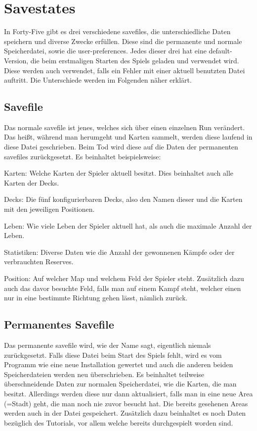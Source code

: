 
\renewcommand{\kapitelautor}{Autor: Felix Zwickelstorfer}
\section{Savestates}\label{sec:savestates}
\renewcommand{\kapitelautor}{Autor: Felix Zwickelstorfer}

In Forty-Five gibt es drei verschiedene savefiles, die unterschiedliche Daten speichern und diverse Zwecke erfüllen.
Diese sind die permanente und normale Speicherdatei, sowie die user-preferences.
Jedes dieser drei hat eine default-Version, die beim erstmaligen Starten des Spiels geladen und verwendet wird.
Diese werden auch verwendet, falls ein Fehler mit einer aktuell benutzten Datei auftritt.
Die Unterschiede werden im Folgenden näher erklärt.

\subsection{Savefile}\label{subsec:savefile}

Das normale savefile ist jenes, welches sich über einen einzelnen Run verändert.
Das heißt, während man herumgeht und Karten sammelt, werden diese laufend in diese Datei geschrieben.
Beim Tod wird diese auf die Daten der permanenten savefiles zurückgesetzt.
Es beinhaltet beispielsweise:
\begin{liste}
    \item Karten: Welche Karten der Spieler aktuell besitzt.
    Dies beinhaltet auch alle Karten der Decks.
    \item Decks: Die fünf konfigurierbaren Decks, also den Namen dieser und die Karten mit den jeweiligen Positionen.
    \item Leben: Wie viele Leben der Spieler aktuell hat, als auch die maximale Anzahl der Leben.
    \item Statistiken: Diverse Daten wie \zB die Anzahl der gewonnenen Kämpfe oder der verbrauchten Reserves.
    \item Position: Auf welcher Map und welchem Feld der Spieler steht.
    Zusätzlich dazu auch das davor besuchte Feld, falls man auf einem Kampf steht, welcher einen nur in eine bestimmte Richtung gehen lässt, nämlich zurück.
\end{liste}

\subsection{Permanentes Savefile}\label{subsec:perma-savefile}
Das permanente savefile wird, wie der Name sagt, eigentlich niemals zurückgesetzt.
Falls diese Datei beim Start des Spiels fehlt, wird es vom Programm wie eine neue Installation gewertet und auch die anderen beiden Speicherdateien werden neu überschrieben.
Es beinhaltet teilweise überschneidende Daten zur normalen Speicherdatei, wie die Karten, die man besitzt.
Allerdings werden diese nur dann aktualisiert, falls man in eine neue Area (=Stadt) geht, die man noch nie zuvor besucht hat.
Die bereits gesehenen Areas werden auch in der Datei gespeichert.
Zusätzlich dazu beinhaltet es noch Daten bezüglich des Tutorials, vor allem welche bereits durchgespielt worden sind.

